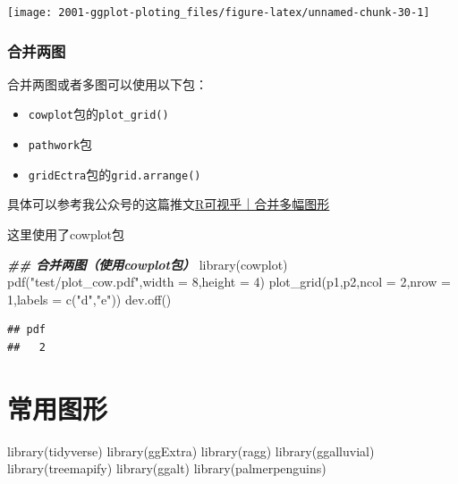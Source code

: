 \documentclass[
]{book}
\newenvironment{Shaded}{\begin{snugshade}}{\end{snugshade}}
\newcommand{\AttributeTok}[1]{\textcolor[rgb]{0.77,0.63,0.00}{#1}}
\newcommand{\DecValTok}[1]{\textcolor[rgb]{0.00,0.00,0.81}{#1}}
\newcommand{\DocumentationTok}[1]{\textcolor[rgb]{0.56,0.35,0.01}{\textbf{\textit{#1}}}}
\newcommand{\FunctionTok}[1]{\textcolor[rgb]{0.00,0.00,0.00}{#1}}
\newcommand{\NormalTok}[1]{#1}
\newcommand{\StringTok}[1]{\textcolor[rgb]{0.31,0.60,0.02}{#1}}
\providecommand{\tightlist}{%
  \setlength{\itemsep}{0pt}\setlength{\parskip}{0pt}}
\begin{document}
\begin{center}\texttt{[image: 2001-ggplot-ploting\_files/figure-latex/unnamed-chunk-30-1]} \end{center}

\hypertarget{ux5408ux5e76ux4e24ux56fe}{%
\subsection{合并两图}\label{ux5408ux5e76ux4e24ux56fe}}

合并两图或者多图可以使用以下包：

\begin{itemize}
\tightlist
\item
  \texttt{cowplot}包的\texttt{plot\_grid()}
\item
  \texttt{pathwork}包
\item
  \texttt{gridEctra}包的\texttt{grid.arrange()}
\end{itemize}

具体可以参考我公众号的这篇推文\href{https://mp.weixin.qq.com/s/goFqnPtH85oXAwlxcacRDw}{R可视乎｜合并多幅图形}

这里使用了cowplot包

\begin{Shaded}
\begin{Highlighting}[]
\DocumentationTok{\#\# 合并两图（使用cowplot包）}
\FunctionTok{library}\NormalTok{(cowplot)}
\FunctionTok{pdf}\NormalTok{(}\StringTok{"test/plot\_cow.pdf"}\NormalTok{,}\AttributeTok{width =} \DecValTok{8}\NormalTok{,}\AttributeTok{height =} \DecValTok{4}\NormalTok{)}
\FunctionTok{plot\_grid}\NormalTok{(p1,p2,}\AttributeTok{ncol =} \DecValTok{2}\NormalTok{,}\AttributeTok{nrow =} \DecValTok{1}\NormalTok{,}\AttributeTok{labels =} \FunctionTok{c}\NormalTok{(}\StringTok{"d"}\NormalTok{,}\StringTok{"e"}\NormalTok{))}
\FunctionTok{dev.off}\NormalTok{()}
\end{Highlighting}
\end{Shaded}

\begin{verbatim}
## pdf 
##   2
\end{verbatim}

\hypertarget{main-diagram-types}{%
\chapter{常用图形}\label{main-diagram-types}}

\begin{Shaded}
\begin{Highlighting}[]
\FunctionTok{library}\NormalTok{(tidyverse)}
\FunctionTok{library}\NormalTok{(ggExtra)}
\FunctionTok{library}\NormalTok{(ragg)}
\FunctionTok{library}\NormalTok{(ggalluvial)}
\FunctionTok{library}\NormalTok{(treemapify)}
\FunctionTok{library}\NormalTok{(ggalt)}
\FunctionTok{library}\NormalTok{(palmerpenguins)}
\end{Highlighting}
\end{Shaded}
\end{document}
